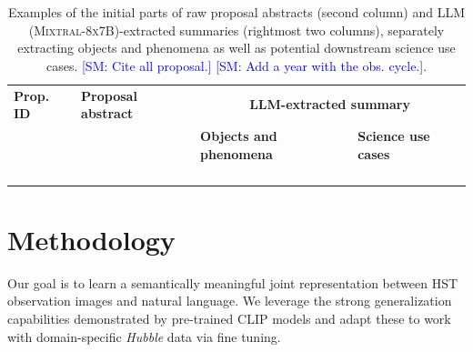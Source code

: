 \documentclass[10pt]{article} %
\newcommand{\SM}[1]{\textcolor{blue}{[SM: #1]}}
\newcommand{\hubble}{\emph{Hubble}\xspace}
\begin{document}
\begin{landscape}
      \begin{table}[h!]
          \centering
          \begin{tabular}{m{1.8cm} m{8cm} m{5cm} m{6cm}}
              \toprule
              \bfseries Prop. ID & \centering\arraybackslash \bfseries Proposal abstract & \multicolumn{2}{c}{\bfseries LLM-extracted summary} \tabularnewline
              \cmidrule(r){3-4}
              & & \centering\arraybackslash \bfseries Objects and phenomena & \centering\arraybackslash \bfseries Science use cases \tabularnewline
              \midrule
               & {\scriptsize } & {\scriptsize } & {\scriptsize } \tabularnewline
              \midrule
               & {\scriptsize } & {\scriptsize } & {\scriptsize } \tabularnewline
              \midrule
               & {\scriptsize } & {\scriptsize } & {\scriptsize } \tabularnewline
              \midrule
               & {\scriptsize } & {\scriptsize } & {\scriptsize } \tabularnewline
              \bottomrule
          \end{tabular}
          \caption{Examples of the initial parts of raw proposal abstracts (second column) and LLM (\textsc{Mixtral-8x7B})-extracted summaries (rightmost two columns), separately extracting objects and phenomena as well as potential downstream science use cases. \SM{Cite all proposal.} \SM{Add a year with the obs. cycle.}.}
          \label{tab:datasetsumm}
      \end{table}
  \end{landscape}

\section{Methodology}
\label{sec:methodology}

Our goal is to learn a semantically  meaningful joint representation between HST observation images and natural language.
%
We leverage the strong generalization capabilities demonstrated by pre-trained CLIP models and adapt these to work with domain-specific \hubble data via fine tuning.
\end{document}

